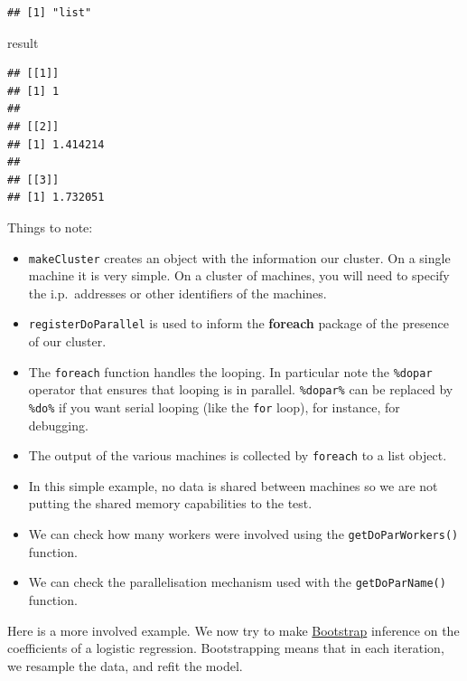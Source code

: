 \documentclass[]{book}
\newenvironment{Shaded}{\begin{snugshade}}{\end{snugshade}}
\newcommand{\NormalTok}[1]{#1}
\providecommand{\tightlist}{%
  \setlength{\itemsep}{0pt}\setlength{\parskip}{0pt}}
\theoremstyle{definition}
\theoremstyle{definition}
\theoremstyle{definition}
\theoremstyle{remark}
\begin{document}
\begin{verbatim}
## [1] "list"
\end{verbatim}

\begin{Shaded}
\begin{Highlighting}[]
\NormalTok{result}
\end{Highlighting}
\end{Shaded}

\begin{verbatim}
## [[1]]
## [1] 1
## 
## [[2]]
## [1] 1.414214
## 
## [[3]]
## [1] 1.732051
\end{verbatim}

Things to note:

\begin{itemize}
\tightlist
\item
  \texttt{makeCluster} creates an object with the information our
  cluster. On a single machine it is very simple. On a cluster of
  machines, you will need to specify the i.p.~addresses or other
  identifiers of the machines.
\item
  \texttt{registerDoParallel} is used to inform the \textbf{foreach}
  package of the presence of our cluster.
\item
  The \texttt{foreach} function handles the looping. In particular note
  the \texttt{\%dopar} operator that ensures that looping is in
  parallel. \texttt{\%dopar\%} can be replaced by \texttt{\%do\%} if you
  want serial looping (like the \texttt{for} loop), for instance, for
  debugging.
\item
  The output of the various machines is collected by \texttt{foreach} to
  a list object.
\item
  In this simple example, no data is shared between machines so we are
  not putting the shared memory capabilities to the test.
\item
  We can check how many workers were involved using the
  \texttt{getDoParWorkers()} function.
\item
  We can check the parallelisation mechanism used with the
  \texttt{getDoParName()} function.
\end{itemize}

Here is a more involved example. We now try to make
\href{https://en.wikipedia.org/wiki/Bootstrapping_(statistics)}{Bootstrap}
inference on the coefficients of a logistic regression. Bootstrapping
means that in each iteration, we resample the data, and refit the model.
\end{document}
